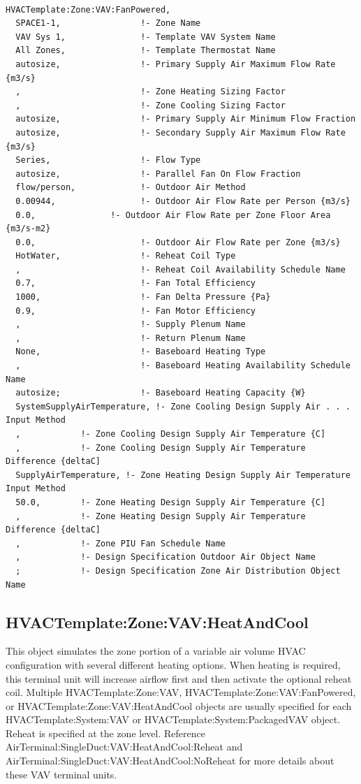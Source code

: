 \begin{lstlisting}

HVACTemplate:Zone:VAV:FanPowered,
  SPACE1-1,                !- Zone Name
  VAV Sys 1,               !- Template VAV System Name
  All Zones,               !- Template Thermostat Name
  autosize,                !- Primary Supply Air Maximum Flow Rate {m3/s}
  ,                        !- Zone Heating Sizing Factor
  ,                        !- Zone Cooling Sizing Factor
  autosize,                !- Primary Supply Air Minimum Flow Fraction
  autosize,                !- Secondary Supply Air Maximum Flow Rate {m3/s}
  Series,                  !- Flow Type
  autosize,                !- Parallel Fan On Flow Fraction
  flow/person,             !- Outdoor Air Method
  0.00944,                 !- Outdoor Air Flow Rate per Person {m3/s}
  0.0,               !- Outdoor Air Flow Rate per Zone Floor Area {m3/s-m2}
  0.0,                     !- Outdoor Air Flow Rate per Zone {m3/s}
  HotWater,                !- Reheat Coil Type
  ,                        !- Reheat Coil Availability Schedule Name
  0.7,                     !- Fan Total Efficiency
  1000,                    !- Fan Delta Pressure {Pa}
  0.9,                     !- Fan Motor Efficiency
  ,                        !- Supply Plenum Name
  ,                        !- Return Plenum Name
  None,                    !- Baseboard Heating Type
  ,                        !- Baseboard Heating Availability Schedule Name
  autosize;                !- Baseboard Heating Capacity {W}
  SystemSupplyAirTemperature, !- Zone Cooling Design Supply Air . . . Input Method
  ,            !- Zone Cooling Design Supply Air Temperature {C]
  ,            !- Zone Cooling Design Supply Air Temperature Difference {deltaC]
  SupplyAirTemperature, !- Zone Heating Design Supply Air Temperature Input Method
  50.0,        !- Zone Heating Design Supply Air Temperature {C]
  ,            !- Zone Heating Design Supply Air Temperature Difference {deltaC]
  ,            !- Zone PIU Fan Schedule Name
  ,            !- Design Specification Outdoor Air Object Name
  ;            !- Design Specification Zone Air Distribution Object Name
\end{lstlisting}

\subsection{HVACTemplate:Zone:VAV:HeatAndCool}\label{hvactemplatezonevavheatandcool}

This object simulates the zone portion of a variable air volume HVAC configuration with several different heating options. When heating is required, this terminal unit will increase airflow first and then activate the optional reheat coil. Multiple HVACTemplate:Zone:VAV, HVACTemplate:Zone:VAV:FanPowered, or HVACTemplate:Zone:VAV:HeatAndCool objects are usually specified for each HVACTemplate:System:VAV or HVACTemplate:System:PackagedVAV object. Reheat is specified at the zone level. Reference AirTerminal:SingleDuct:VAV:HeatAndCool:Reheat and AirTerminal:SingleDuct:VAV:HeatAndCool:NoReheat for more details about these VAV terminal units.

